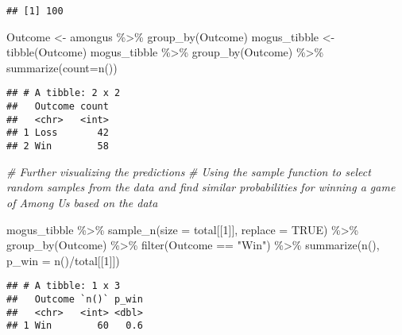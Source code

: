 \documentclass[
]{article}
\newenvironment{Shaded}{\begin{snugshade}}{\end{snugshade}}
\newcommand{\AttributeTok}[1]{\textcolor[rgb]{0.77,0.63,0.00}{#1}}
\newcommand{\CommentTok}[1]{\textcolor[rgb]{0.56,0.35,0.01}{\textit{#1}}}
\newcommand{\ConstantTok}[1]{\textcolor[rgb]{0.00,0.00,0.00}{#1}}
\newcommand{\DecValTok}[1]{\textcolor[rgb]{0.00,0.00,0.81}{#1}}
\newcommand{\FunctionTok}[1]{\textcolor[rgb]{0.00,0.00,0.00}{#1}}
\newcommand{\NormalTok}[1]{#1}
\newcommand{\OtherTok}[1]{\textcolor[rgb]{0.56,0.35,0.01}{#1}}
\newcommand{\SpecialCharTok}[1]{\textcolor[rgb]{0.00,0.00,0.00}{#1}}
\newcommand{\StringTok}[1]{\textcolor[rgb]{0.31,0.60,0.02}{#1}}
\begin{document}
\begin{verbatim}
## [1] 100
\end{verbatim}

\begin{Shaded}
\begin{Highlighting}[]
\NormalTok{Outcome }\OtherTok{\textless{}{-}}\NormalTok{ amongus }\SpecialCharTok{\%\textgreater{}\%} \FunctionTok{group\_by}\NormalTok{(Outcome)}
\NormalTok{mogus\_tibble }\OtherTok{\textless{}{-}} \FunctionTok{tibble}\NormalTok{(Outcome)}
\NormalTok{mogus\_tibble }\SpecialCharTok{\%\textgreater{}\%} \FunctionTok{group\_by}\NormalTok{(Outcome) }\SpecialCharTok{\%\textgreater{}\%} \FunctionTok{summarize}\NormalTok{(}\AttributeTok{count=}\FunctionTok{n}\NormalTok{())}
\end{Highlighting}
\end{Shaded}

\begin{verbatim}
## # A tibble: 2 x 2
##   Outcome count
##   <chr>   <int>
## 1 Loss       42
## 2 Win        58
\end{verbatim}

\begin{Shaded}
\begin{Highlighting}[]
\CommentTok{\# Further visualizing the predictions}
\CommentTok{\# Using the sample function to select random samples from the data and find similar probabilities for winning a game of Among Us based on the data}

\NormalTok{mogus\_tibble }\SpecialCharTok{\%\textgreater{}\%}
  \FunctionTok{sample\_n}\NormalTok{(}\AttributeTok{size =}\NormalTok{ total[[}\DecValTok{1}\NormalTok{]], }\AttributeTok{replace =} \ConstantTok{TRUE}\NormalTok{) }\SpecialCharTok{\%\textgreater{}\%}
  \FunctionTok{group\_by}\NormalTok{(Outcome) }\SpecialCharTok{\%\textgreater{}\%}
  \FunctionTok{filter}\NormalTok{(Outcome }\SpecialCharTok{==} \StringTok{"Win"}\NormalTok{) }\SpecialCharTok{\%\textgreater{}\%}
  \FunctionTok{summarize}\NormalTok{(}\FunctionTok{n}\NormalTok{(), }\AttributeTok{p\_win =} \FunctionTok{n}\NormalTok{()}\SpecialCharTok{/}\NormalTok{total[[}\DecValTok{1}\NormalTok{]])}
\end{Highlighting}
\end{Shaded}

\begin{verbatim}
## # A tibble: 1 x 3
##   Outcome `n()` p_win
##   <chr>   <int> <dbl>
## 1 Win        60   0.6
\end{verbatim}
\end{document}

